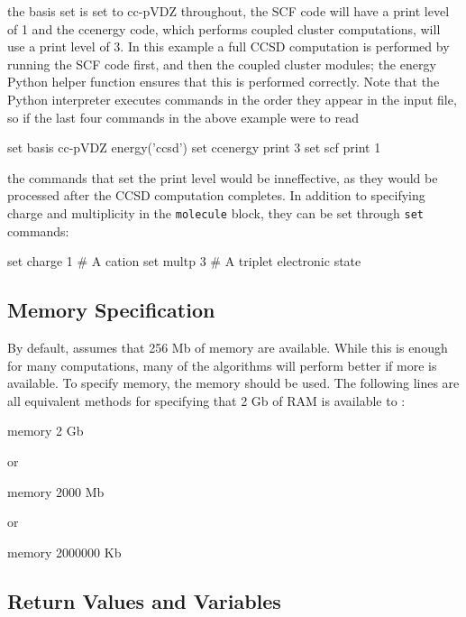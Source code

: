 the basis set is set to cc-pVDZ throughout, the SCF code will have a print
level of 1 and the ccenergy code, which performs coupled cluster computations,
will use a print level of 3. In this example a full CCSD computation is
performed by running the SCF code first, and then the coupled cluster modules;
the energy Python helper function ensures that this is performed correctly.
Note that the Python interpreter executes commands in the order they appear in
the input file, so if the last four commands in the above example were to read
\begin{Snippet}
set basis cc-pVDZ
energy('ccsd')
set ccenergy print 3
set scf print 1
\end{Snippet}
the commands that set the print level would be inneffective, as they would be
processed after the CCSD computation completes. In addition to specifying
charge and multiplicity in the {\tt molecule} block, they can be set through {\tt set}
commands:
\begin{Snippet}
set charge 1 # A cation
set multp 3  # A triplet electronic state
\end{Snippet}

\subsection{Memory Specification}
By default, \PSIfour assumes that 256 Mb of memory are available. While this is
enough for many computations, many of the algorithms will perform better if
more is available. To specify memory, the memory should be used. The following
lines are all equivalent methods for specifying that 2 Gb of RAM is available
to \PSIfour:
\begin{Snippet}
memory 2 Gb

 or

memory 2000 Mb

 or

memory 2000000 Kb
\end{Snippet}

\subsection{Return Values and \PSI Variables}

